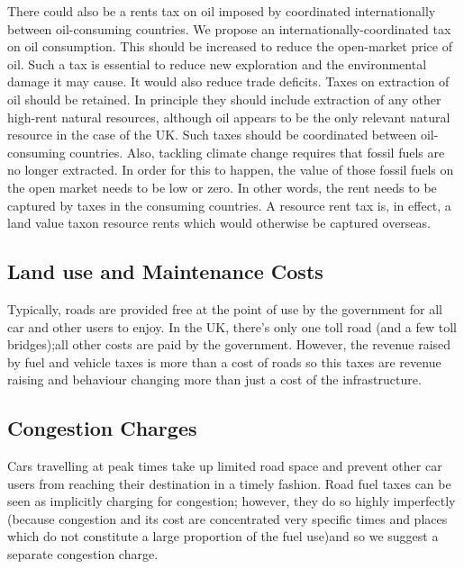 \documentclass[]{tufte-handout}
\begin{document}
There could also be a rents tax on oil imposed by coordinated
internationally between oil-consuming countries. We propose an
internationally-coordinated tax on oil consumption. This should be
increased to reduce the open-market price of oil. Such a tax is
essential to reduce new exploration and the environmental damage it may
cause. It would also reduce trade deficits. Taxes on extraction of oil
should be retained. In principle they should include extraction of any
other high-rent natural resources, although oil appears to be the only
relevant natural resource in the case of the UK. Such taxes should be
coordinated between oil-consuming countries. Also, tackling climate
change requires that fossil fuels are no longer extracted. In order for
this to happen, the value of those fossil fuels on the open market needs
to be low or zero. In other words, the rent needs to be captured by
taxes in the consuming countries. A resource rent tax is, in effect, a
land value taxon resource rents which would otherwise be captured
overseas.

\hypertarget{land-use-and-maintenance-costs}{%
\subsection{Land use and Maintenance
Costs}\label{land-use-and-maintenance-costs}}

Typically, roads are provided free at the point of use by the government
for all car and other users to enjoy. In the UK, there's only one toll
road (and a few toll bridges);all other costs are paid by the
government. However, the revenue raised by fuel and vehicle taxes is
more than a cost of roads so this taxes are revenue raising and
behaviour changing more than just a cost of the infrastructure.

\hypertarget{congestion-charges}{%
\subsection{Congestion Charges}\label{congestion-charges}}

Cars travelling at peak times take up limited road space and prevent
other car users from reaching their destination in a timely fashion.
Road fuel taxes can be seen as implicitly charging for congestion;
however, they do so highly imperfectly (because congestion and its cost
are concentrated very specific times and places which do not constitute
a large proportion of the fuel use)and so we suggest a separate
congestion charge.
\end{document}
